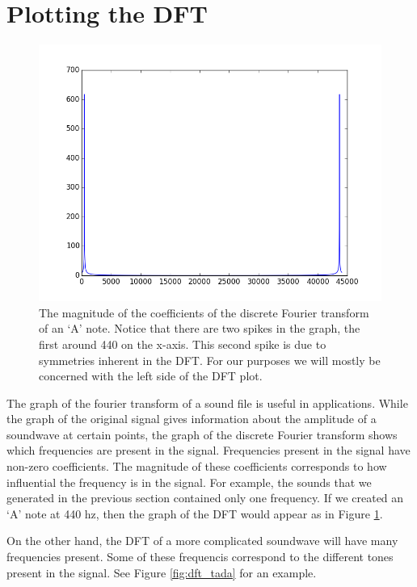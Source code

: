 \section*{Plotting the DFT}

\begin{center}
\begin{figure}
\includegraphics[scale=0.7]{a_dft}
\caption{The magnitude of the coefficients of the discrete Fourier transform of an `A' note.  Notice that there are two spikes in the graph, the first around 440 on the x-axis.  This second spike is due to symmetries inherent in the DFT.  For our purposes we will mostly be concerned with the left side of the DFT plot.}
\label{fig:dft_a}
\end{figure}
\end{center}

The graph of the fourier transform of a sound file is useful in applications.
While the graph of the original signal gives information about the amplitude of a soundwave at certain points, the graph of the discrete Fourier transform  shows which frequencies are present in the signal.
Frequencies present in the signal have non-zero coefficients.
The magnitude of these coefficients corresponds to how influential the frequency is in the signal.
For example, the sounds that we generated in the previous section contained only one frequency.
If we created an `A' note at 440 hz, then the graph of the DFT would appear as in Figure \ref{fig:dft_a}.

On the other hand, the DFT of a more complicated soundwave will have many frequencies present.
Some of these frequencis correspond to the different tones present in the signal.
See Figure \ref{fig:dft_tada} for an example.

